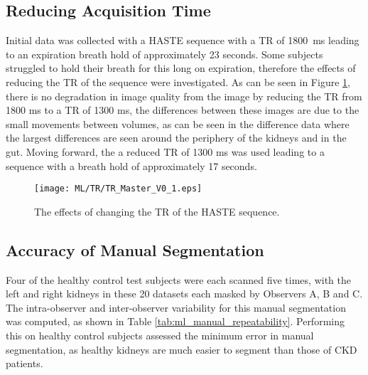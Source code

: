 \subsection{Reducing Acquisition Time}
Initial data was collected with a \ac{HASTE} sequence with a \ac{TR} of 1800~ms leading to an expiration breath hold of approximately 23 seconds. Some subjects struggled to hold their breath for this long on expiration, therefore the effects of reducing the \ac{TR} of the sequence were investigated. As can be seen in Figure \ref{fig:ml_tr}, there is no degradation in image quality from the image by reducing the \ac{TR} from 1800 ms to a \ac{TR} of 1300 ms, the differences between these images are due to the small movements between volumes, as can be seen in the difference data where the largest differences are seen around the periphery of the kidneys and in the gut. Moving forward, the a reduced \ac{TR} of 1300 ms was used leading to a sequence with a breath hold of approximately 17 seconds.

\begin{figure}[H]
	\centering
	\texttt{[image: ML/TR/TR\_Master\_V0\_1.eps]}
	\caption{The effects of changing the \ac{TR} of the \ac{HASTE} sequence.}
	\label{fig:ml_tr}	
\end{figure}

\subsection{Accuracy of Manual Segmentation}
Four of the healthy control test subjects were each scanned five times, with the left and right kidneys in these 20 datasets each masked by Observers A, B and C. The intra-observer and inter-observer variability for this manual segmentation was computed, as shown in Table \ref{tab:ml_manual_repeatability}. Performing this on healthy control subjects assessed the minimum error in manual segmentation, as healthy kidneys are much easier to segment than those of \ac{CKD} patients.

